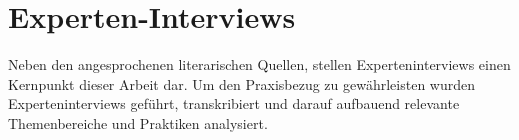 \section{Experten-Interviews}\label{interviews}
Neben den angesprochenen literarischen Quellen, stellen Experteninterviews einen Kernpunkt dieser Arbeit dar. Um den Praxisbezug zu gewährleisten wurden Experteninterviews geführt, transkribiert und darauf aufbauend relevante Themenbereiche und Praktiken analysiert.
\medskip
